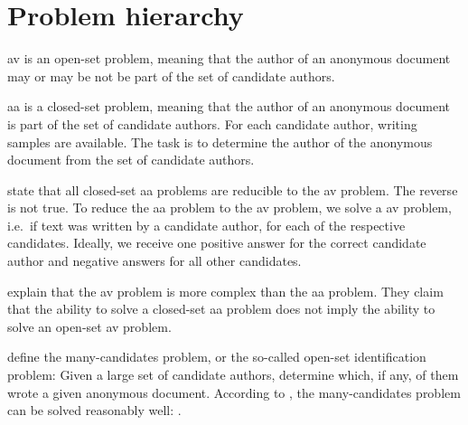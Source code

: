 \section{Problem hierarchy}
\label{sec:problem_hierarchy}


\ac{av} is an open-set problem, meaning that the author of an anonymous document 
may or may be not be part of the set of candidate authors.

\ac{aa} is a closed-set problem, meaning that the author of an anonymous document
is part of the set of candidate authors.
For each candidate author, writing samples are available.
The task is to determine the author of the anonymous document from the set of candidate authors.

\citet{koppel_determining_2014} state that all closed-set \ac{aa} problems are reducible to the \ac{av} problem.
The reverse is not true.
To reduce the \ac{aa} problem to the \ac{av} problem, we solve a \ac{av} problem, i.e.\ if text was written by a candidate author, 
for each of the respective candidates.
Ideally, we receive one positive answer for the correct candidate author and negative answers for all other candidates.

\citet{koppel_determining_2014} explain that the \ac{av} problem is more complex than the \ac{aa} problem.
They claim that the ability to solve a closed-set \ac{aa} problem does not imply the ability to solve an open-set \ac{av} problem.

\citet{koppel_determining_2014} define the many-candidates problem, or the so-called open-set identification problem:
Given a large set of candidate authors, determine which, if any, of them wrote a given anonymous document.
According to \citet{koppel_determining_2014}, the many-candidates problem can be solved reasonably well: .

